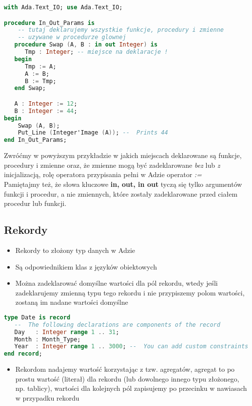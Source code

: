 \documentclass[a4paper,15pt]{article}
\begin{document}
\begin{lstlisting}[language=Ada, caption=Poprawna wersja]
with Ada.Text_IO; use Ada.Text_IO;

procedure In_Out_Params is
	-- tutaj deklarujemy wszystkie funkcje, procedury i zmienne
	-- uzywane w procedurze glownej
   procedure Swap (A, B : in out Integer) is
      Tmp : Integer; -- miejsce na deklaracje !
   begin
      Tmp := A;
      A := B;
      B := Tmp;
   end Swap;

   A : Integer := 12;
   B : Integer := 44;
begin
    Swap (A, B);
    Put_Line (Integer'Image (A)); --  Prints 44
end In_Out_Params;
\end{lstlisting}

Zwróćmy w powyższym przykładzie w jakich miejscach deklarowane są funkcje, procedury i zmienne oraz, że zmienne mogą być zadeklarowane \textit{bez} lub \textit{z} inicjalizacją, rolę operatora przypisania pełni w Adzie operator \textit{:=} \\
Pamiętajmy też, że słowa kluczowe \textbf{in, out, in out} tyczą się tylko argumentów funkcji i procedur, a nie zmiennych, które zostały zadeklarowane przed ciałem procedur lub funkcji. 

\subsection{Rekordy}

\begin{itemize}
\item Rekordy to złożony typ danych w Adzie
\item Są odpowiednikiem klas z języków obiektowych
\item Można zadeklarować domyślne wartości dla pól rekordu, wtedy jeśli zadeklarujemy zmienną typu tego rekordu i nie przypiszemy polom wartości, zostaną im nadane wartości domyślne
\end{itemize}

\begin{lstlisting}[language=Ada, caption=Przyklad rekordu w Adzie]
type Date is record
   --  The following declarations are components of the record
   Day   : Integer range 1 .. 31;
   Month : Month_Type;
   Year  : Integer range 1 .. 3000; --  You can add custom constraints on fields
end record;
\end{lstlisting}

\begin{itemize}
\item Rekordom nadajemy wartość korzystając z tzw. agregatów, agregat to po prostu wartość (literał) dla rekordu (lub dowolnego innego typu złożonego, np. tablicy), wartości dla kolejnych pól zapisujemy po przecinku w nawiasach w przypadku rekordu
\end{itemize}
\end{document}
